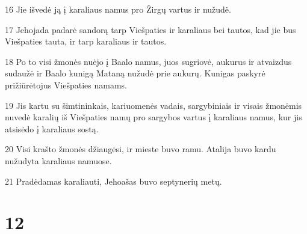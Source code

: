 \par 16 Jie išvedė ją į karaliaus namus pro Žirgų vartus ir nužudė. 
\par 17 Jehojada padarė sandorą tarp Viešpaties ir karaliaus bei tautos, kad jie bus Viešpaties tauta, ir tarp karaliaus ir tautos. 
\par 18 Po to visi žmonės nuėjo į Baalo namus, juos sugriovė, aukurus ir atvaizdus sudaužė ir Baalo kunigą Mataną nužudė prie aukurų. Kunigas paskyrė prižiūrėtojus Viešpaties namams. 
\par 19 Jis kartu su šimtininkais, kariuomenės vadais, sargybiniais ir visais žmonėmis nuvedė karalių iš Viešpaties namų pro sargybos vartus į karaliaus namus, kur jis atsisėdo į karaliaus sostą. 
\par 20 Visi krašto žmonės džiaugėsi, ir mieste buvo ramu. Atalija buvo kardu nužudyta karaliaus namuose. 
\par 21 Pradėdamas karaliauti, Jehoašas buvo septynerių metų.



\chapter{12}

